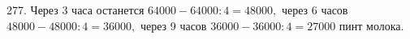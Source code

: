 277. Через 3 часа останется $64000-64000:4=48000,$ через 6 часов $48000-48000:4=36000,$ через 9 часов $36000-36000:4=27000$ пинт молока.\\
